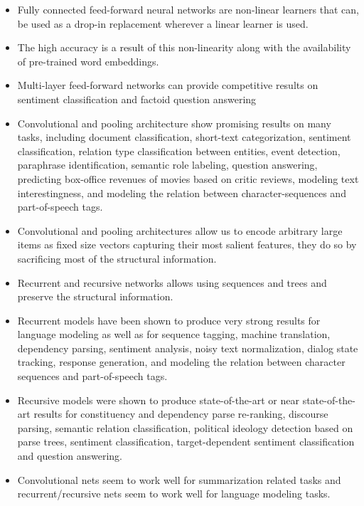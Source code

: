 \documentclass[11pt,a4paper]{article}
\begin{document}
  \begin{itemize}
    \item 
    Fully connected feed-forward neural networks are non-linear learners that can, be used as a drop-in replacement wherever a linear learner is used.
    \item 
    The high accuracy is a result of this non-linearity along with the availability of pre-trained word embeddings.
    \item 
    Multi-layer feed-forward networks can provide competitive results on sentiment classification and factoid question answering
    \item 
    Convolutional and pooling architecture show promising results on many tasks, including document classification, short-text categorization, sentiment classification, relation type classification between entities, event detection, paraphrase identification, semantic role labeling, question answering, predicting box-office revenues of movies based on critic reviews, modeling text interestingness, and modeling the relation between character-sequences and part-of-speech tags.
    \item 
    Convolutional and pooling architectures allow us to encode arbitrary large items as fixed size vectors capturing their most salient features, they do so by sacrificing most of the structural information.
    \item 
    Recurrent and recursive networks allows using sequences and trees and preserve the structural information.
    \item 
    Recurrent models have been shown to produce very strong results for language modeling as well as for sequence tagging, machine translation, dependency parsing, sentiment analysis, noisy text normalization, dialog state tracking, response generation, and modeling the relation between character sequences and part-of-speech tags. 
    \item 
    Recursive models were shown to produce state-of-the-art or near state-of-the-art results for constituency and dependency parse re-ranking, discourse parsing, semantic relation classification, political ideology detection based on parse trees, sentiment classification, target-dependent sentiment classification and question answering.
    \item 
    Convolutional nets seem to work well for summarization related tasks and recurrent/recursive nets seem to work well for language modeling tasks.
  \end{itemize}
\end{document}
